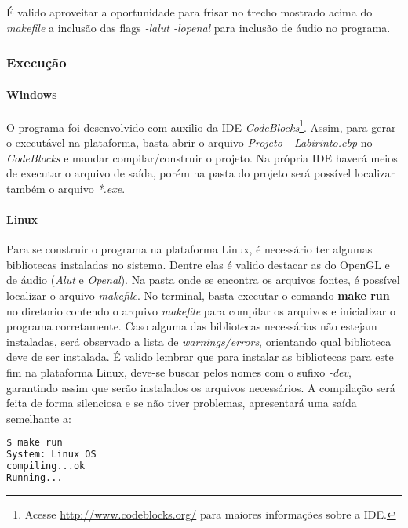 É valido aproveitar a oportunidade para frisar no trecho mostrado acima do \textit{makefile} a inclusão das flags \textit{-lalut -lopenal} para inclusão de áudio no programa.



\subsubsection{Execução}\label{exe}

\paragraph{\textbf{Windows}}

O programa foi desenvolvido com auxilio da IDE \textit{CodeBlocks}\footnote{Acesse \url{http://www.codeblocks.org/} para maiores informações sobre a IDE.}. Assim, para gerar o executável na plataforma, basta abrir o arquivo \textit{Projeto - Labirinto.cbp} no \textit{CodeBlocks} e mandar compilar/construir o projeto. Na própria IDE haverá meios de executar o arquivo de saída, porém na pasta do projeto será possível localizar também o arquivo \textit{*.exe}.

\paragraph{\textbf{Linux}}

Para se construir o programa na plataforma Linux, é necessário ter algumas bibliotecas instaladas no sistema. Dentre elas é valido destacar as do OpenGL e de áudio (\textit{Alut} e \textit{Openal}). Na pasta onde se encontra os arquivos fontes, é possível localizar o arquivo \textit{makefile}. No terminal, basta executar o comando \textbf{make run} no diretorio contendo o arquivo \textit{makefile} para compilar os arquivos e inicializar o programa corretamente. Caso alguma das bibliotecas necessárias não estejam instaladas, será observado a lista de \textit{warnings/errors}, orientando qual biblioteca deve de ser instalada. É valido lembrar que para instalar as bibliotecas para este fim na plataforma Linux, deve-se buscar pelos nomes com o sufixo \textit{-dev}, garantindo assim que serão instalados os arquivos necessários. A compilação será feita de forma silenciosa e se não tiver problemas, apresentará uma saída semelhante a:

\begin{lstlisting}[language=bash,title=\textit{Saída do terminal - Linux},numbers=none]
$ make run
System: Linux OS
compiling...ok
Running...
\end{lstlisting}

